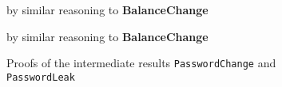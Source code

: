 \begin{figure}[t]
\begin{proofexample}
	{
			{by similar reasoning to \textbf{BalanceChange}}
	}
\endproofsteps
\end{proofexample}
\begin{proofexample}
	{
			{by similar reasoning to \textbf{BalanceChange}}
	}
\endproofsteps
\end{proofexample}
\caption{Proofs of the intermediate results \texttt{PasswordChange} and \texttt{PasswordLeak}}
\end{figure}

